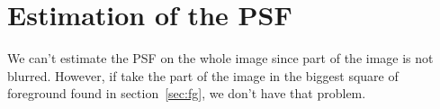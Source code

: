 \section{Estimation of the PSF}
We can't estimate the PSF on the whole image since part of the image is not blurred.
However, if take the part of the image in the biggest square of foreground found in section~\ref{sec:fg},
we don't have that problem.
